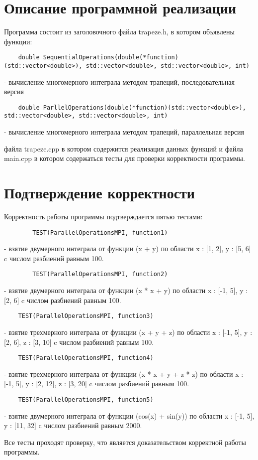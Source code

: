 \documentclass{report}
\begin{document}
	\section*{Описание программной реализации}
	Программа состоит из заголовочного файла trapeze.h, в котором объявлены функции:
	\begin{lstlisting}
	double SequentialOperations(double(*function)(std::vector<double>), std::vector<double>, std::vector<double>, int)\end{lstlisting} - вычисление многомерного интеграла методом трапеций, последовательная версия
    \begin{lstlisting}
	double ParllelOperations(double(*function)(std::vector<double>), std::vector<double>, std::vector<double>, int)\end{lstlisting} - вычисление многомерного интеграла методом трапеций, параллельная версия 
	\par файла trapeze.cpp в котором содержится реализация данных функций и файла main.cpp в котором содержаться тесты для проверки корректности программы.
	\newpage
	
	\section*{Подтверждение корректности}
	Корректность работы программы подтверждается пятью тестами:
	\begin{lstlisting}
		TEST(ParallelOperationsMPI, function1)
	\end{lstlisting} - взятие двумерного интеграла от функции (x + y) по области x : [1, 2], y : [5, 6] c числом разбиений равным 100. 
	\begin{lstlisting}
		TEST(ParallelOperationsMPI, function2)
	\end{lstlisting}
	- взятие двумерного интеграла от функции (x * x + y) по области x : [-1, 5], y : [2, 6] c числом разбиений равным 100. 
	\begin{lstlisting}
	TEST(ParallelOperationsMPI, function3)
	\end{lstlisting}
	 - взятие трехмерного интеграла от функции (x + y + z) по области x : [-1, 5], y : [2, 6], z : [3, 10] c числом разбиений равным 100. 
	\begin{lstlisting}
	TEST(ParallelOperationsMPI, function4)
    \end{lstlisting}
	 - взятие трехмерного интеграла от функции (x * x + y + z * z) по области x : [-1, 5], y : [2, 12], z : [3, 20] c числом разбиений равным 100.
	\begin{lstlisting}
	TEST(ParallelOperationsMPI, function5)
    \end{lstlisting}
	 - взятие двумерного интеграла от функции (cos(x) + sin(y)) по области x : [-1, 5], y : [11, 32] c числом разбиений равным 2000.  
	\par Все тесты проходят проверку, что является доказательством корректной работы программы.
	\newpage
	
\end{document}
